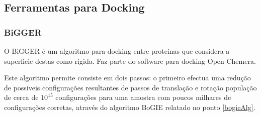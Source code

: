 \subsection{Ferramentas para Docking}
\subsubsection{BiGGER}
\label{biggerAlg}
O BiGGER\cite{biggerPaper} é um algoritmo para docking entre proteinas que considera a superficie destas como rigida. Faz parte do software para docking Open-Chemera.

Este algoritmo permite consiste em dois passos: o primeiro efectua uma redução de possiveis configurações resultantes de passos de translação e rotação população de cerca de $10^{15}$ configurações para uma amostra com poucos milhares de configurações corretas, através do algoritmo BoGIE relatado no ponto \ref{bogieAlg}.

